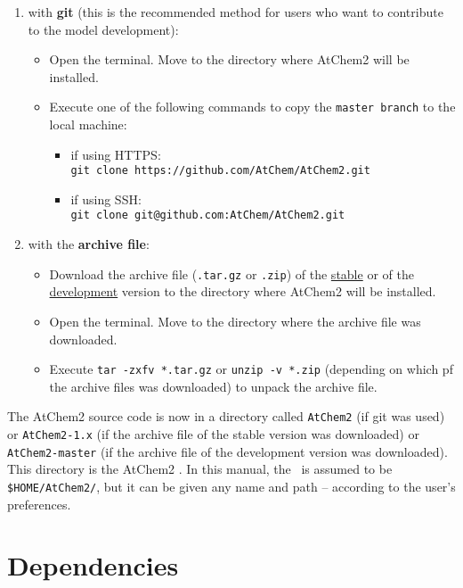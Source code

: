 \begin{enumerate}
\item with \textbf{git} (this is the recommended method for users who
  want to contribute to the model development):
  \begin{itemize}
  \item Open the terminal. Move to the directory where AtChem2 will be
    installed.
  \item Execute one of the following commands to copy the
    \texttt{master\ branch} to the local machine:
    \begin{itemize}
      \item if using HTTPS:\\
        \verb|git clone https://github.com/AtChem/AtChem2.git|
      \item if using SSH:\\
        \verb|git clone git@github.com:AtChem/AtChem2.git|
    \end{itemize}
  \end{itemize}
\item with the \textbf{archive file}:
  \begin{itemize}
  \item Download the archive file (\texttt{.tar.gz} or \texttt{.zip}) of the
    \href{https://github.com/AtChem/AtChem2/releases}{stable} or of the
    \href{https://github.com/AtChem/AtChem2/archive/master.zip}{development}
    version to the directory where AtChem2 will be installed.
  \item Open the terminal. Move to the directory where the archive
    file was downloaded.
  \item Execute \verb|tar -zxfv *.tar.gz| or \verb|unzip -v *.zip|
    (depending on which pf the archive files  was downloaded) to unpack
    the archive file.
  \end{itemize}
\end{enumerate}

The AtChem2 source code is now in a directory called \texttt{AtChem2}
(if git was used) or \texttt{AtChem2-1.x} (if the archive file of the
stable version was downloaded) or \texttt{AtChem2-master} (if the
archive file of the development version was downloaded). This
directory is the AtChem2 \maindir. In this manual, the \maindir\ is
assumed to be \texttt{\$HOME/AtChem2/}, but it can be given any name
and path -- according to the user's preferences.

\section{Dependencies} \label{sec:dependencies}

